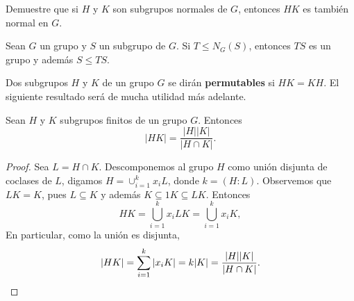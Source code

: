 \begin{exercise}
Demuestre que si $H$ y $K$ son subgrupos normales de $G$, entonces $HK$ es también normal en $G$.
\end{exercise}

\begin{exercise}
Sean $G$ un grupo y $S$ un subgrupo de $G$. 
Si $T\leq N_G(S)$, entonces $TS$ es un grupo y además $S\leq TS$. 
\end{exercise}

Dos subgrupos $H$ y $K$ de un grupo $G$ se dirán \textbf{permutables} si $HK=KH$. 
El siguiente resultado será de mucha utilidad más adelante.

\begin{theorem}
\label{thm:|HK|}
	Sean $H$ y $K$ subgrupos finitos de un grupo $G$. Entonces
	\[
		|HK|=\frac{|H||K|}{|H\cap K|}.
	\]
\end{theorem}
	
\begin{proof}
Sea $L=H\cap K$. 
Descomponemos al grupo $H$ como unión disjunta de coclases de $L$, digamos 
$H=\cup_{i=1}^k x_iL$, donde $k=(H:L)$. Observemos que $LK=K$, pues $L\subseteq K$ y además $K\subseteq 1K\subseteq LK$. 
Entonces
\[
HK=\bigcup_{i=1}^k x_iLK=\bigcup_{i=1}^k x_iK,
\]
En particular, como la unión es disjunta, 
\[
|HK|=\sum_{i=1}^k |x_iK|=k|K|=\frac{|H||K|}{|H\cap K|}.\qedhere
\] 
\end{proof}

%	

